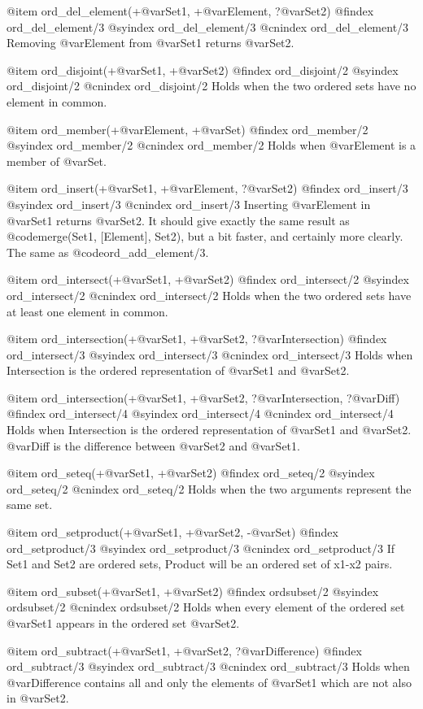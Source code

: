 {{{{{{{{{@item ord_del_element(+@var{Set1}, +@var{Element}, ?@var{Set2})
@findex ord_del_element/3
@syindex ord_del_element/3
@cnindex ord_del_element/3
Removing @var{Element} from @var{Set1} returns @var{Set2}.

@item ord_disjoint(+@var{Set1}, +@var{Set2})
@findex ord_disjoint/2
@syindex ord_disjoint/2
@cnindex ord_disjoint/2
Holds when the two ordered sets have no element in common.

@item ord_member(+@var{Element}, +@var{Set})
@findex ord_member/2
@syindex ord_member/2
@cnindex ord_member/2
Holds when @var{Element} is a member of @var{Set}.

@item ord_insert(+@var{Set1}, +@var{Element}, ?@var{Set2})
@findex ord_insert/3
@syindex ord_insert/3
@cnindex ord_insert/3
Inserting @var{Element} in @var{Set1} returns @var{Set2}.  It should give
exactly the same result as @code{merge(Set1, [Element], Set2)}, but a
bit faster, and certainly more clearly. The same as @code{ord_add_element/3}.

@item ord_intersect(+@var{Set1}, +@var{Set2})
@findex ord_intersect/2
@syindex ord_intersect/2
@cnindex ord_intersect/2
Holds when the two ordered sets have at least one element in common.

@item ord_intersection(+@var{Set1}, +@var{Set2}, ?@var{Intersection})
@findex ord_intersect/3
@syindex ord_intersect/3
@cnindex ord_intersect/3
Holds when Intersection is the ordered representation of @var{Set1}
and @var{Set2}.

@item ord_intersection(+@var{Set1}, +@var{Set2}, ?@var{Intersection}, ?@var{Diff})
@findex ord_intersect/4
@syindex ord_intersect/4
@cnindex ord_intersect/4
Holds when Intersection is the ordered representation of @var{Set1}
and @var{Set2}. @var{Diff} is the difference between @var{Set2} and @var{Set1}.

@item ord_seteq(+@var{Set1}, +@var{Set2})
@findex ord_seteq/2
@syindex ord_seteq/2
@cnindex ord_seteq/2
Holds when the two arguments represent the same set.

@item ord_setproduct(+@var{Set1}, +@var{Set2}, -@var{Set})
@findex ord_setproduct/3
@syindex ord_setproduct/3
@cnindex ord_setproduct/3
If Set1 and Set2 are ordered sets, Product will be an ordered
set of x1-x2 pairs.

@item ord_subset(+@var{Set1}, +@var{Set2})
@findex ordsubset/2
@syindex ordsubset/2
@cnindex ordsubset/2
Holds when every element of the ordered set @var{Set1} appears in the
ordered set @var{Set2}.

@item ord_subtract(+@var{Set1}, +@var{Set2}, ?@var{Difference})
@findex ord_subtract/3
@syindex ord_subtract/3
@cnindex ord_subtract/3
Holds when @var{Difference} contains all and only the elements of @var{Set1}
which are not also in @var{Set2}.

}}}}}}}}}
